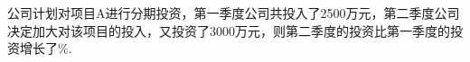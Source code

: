 公司计划对项目A进行分期投资，第一季度公司共投入了2500万元，第二季度公司决定加大对该项目的投入，又投资了3000万元，则第二季度的投资比第一季度的投资增长了\key{\hspace{1cm}}$\%$.




